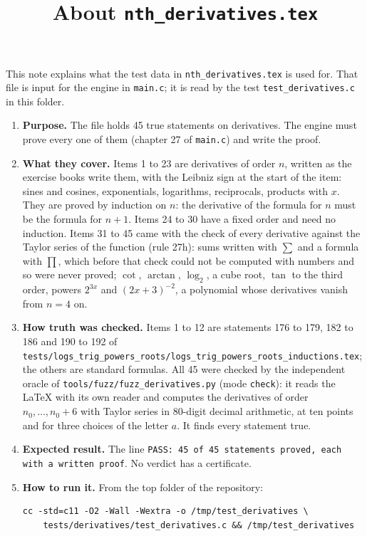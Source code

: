 \documentclass[11pt,a4paper]{article}
\title{About \texttt{nth\_derivatives.tex}}
\author{}
\date{}
\begin{document}
\maketitle
This note explains what the test data in \texttt{nth\_derivatives.tex} is used for. That file is input for the engine in \texttt{main.c}; it is read by the test \texttt{test\_derivatives.c} in this folder.

\begin{enumerate}
\item \textbf{Purpose.} The file holds 45 true statements on derivatives. The engine must prove every one of them (chapter 27 of \texttt{main.c}) and write the proof.

\item \textbf{What they cover.} Items 1 to 23 are derivatives of order $n$, written as the exercise books write them, with the Leibniz sign at the start of the item: sines and cosines, exponentials, logarithms, reciprocals, products with $x$. They are proved by induction on $n$: the derivative of the formula for $n$ must be the formula for $n + 1$. Items 24 to 30 have a fixed order and need no induction. Items 31 to 45 came with the check of every derivative against the Taylor series of the function (rule 27h): sums written with $\sum$ and a formula with $\prod$, which before that check could not be computed with numbers and so were never proved; $\cot$, $\arctan$, $\log_2$, a cube root, $\tan$ to the third order, powers $2^{3x}$ and $(2x + 3)^{-2}$, a polynomial whose derivatives vanish from $n = 4$ on.

\item \textbf{How truth was checked.} Items 1 to 12 are statements 176 to 179, 182 to 186 and 190 to 192 of \texttt{tests/logs\_trig\_powers\_roots/logs\_trig\_powers\_roots\_inductions.tex}; the others are standard formulas. All 45 were checked by the independent oracle of \texttt{tools/fuzz/fuzz\_derivatives.py} (mode \texttt{check}): it reads the \LaTeX{} with its own reader and computes the derivatives of order $n_0, \dots, n_0 + 6$ with Taylor series in 80-digit decimal arithmetic, at ten points and for three choices of the letter $a$. It finds every statement true.

\item \textbf{Expected result.} The line \texttt{PASS: 45 of 45 statements proved, each with a written proof}. No verdict has a certificate.

\item \textbf{How to run it.} From the top folder of the repository:
\begin{verbatim}
cc -std=c11 -O2 -Wall -Wextra -o /tmp/test_derivatives \
    tests/derivatives/test_derivatives.c && /tmp/test_derivatives
\end{verbatim}
\end{enumerate}
\end{document}
